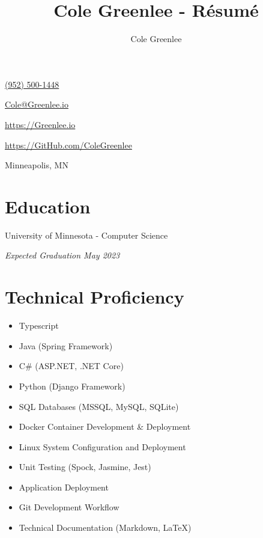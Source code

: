 \documentclass{article}
\title{Cole Greenlee - R\'esum\'e}
\author{Cole Greenlee}
\renewcommand{\maketitle}{
{\huge\bfseries\theauthor}
}
\begin{document}
\selectfont
\begin{multicols}{2}
	\begin{description}
		\item\maketitle
		\item\href{tel:+19525001448}{(952) 500-1448}
		\item\href{mailto:Cole@Greenlee.io}{Cole@Greenlee.io}
		\begin{flushright}
			\vspace{-1.5em}
			\item\href{https://Greenlee.io}{https://Greenlee.io}
			\item\href{https://GitHub.com/ColeGreenlee/}{https://GitHub.com/ColeGreenlee}
			\item Minneapolis, MN
		\end{flushright}
	\end{description}
\end{multicols}

\section{Education}
\vspace{-1.5em}
\begin{multicols}{2}
	\begin{flushleft}
		University of Minnesota - Computer Science
	\end{flushleft}
	\begin{flushright}
		\textit{Expected Graduation May 2023}
	\end{flushright}
\end{multicols}

\section{Technical Proficiency}
\vspace{-1.5em}
\begin{multicols}{2}
	\begin{itemize}[leftmargin=*]
		\item Typescript
		\item Java (Spring Framework)
		\item C\# (ASP.NET, .NET Core)
		\item Python (Django Framework)
		\item SQL Databases (MSSQL, MySQL, SQLite)
		\item Docker Container Development \& Deployment
		\item Linux System Configuration and Deployment
		\item Unit Testing (Spock, Jasmine, Jest)
		\item Application Deployment
		\item Git Development Workflow
		\item Technical Documentation (Markdown, LaTeX)
	\end{itemize}
\end{multicols}
\end{document}
